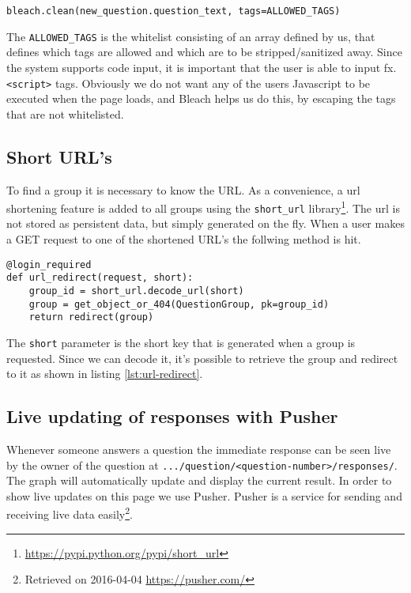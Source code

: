 \begin{lstlisting}[caption=Using Bleach to sanitize input, label=lst:bleach]
bleach.clean(new_question.question_text, tags=ALLOWED_TAGS)
\end{lstlisting}

The \texttt{ALLOWED\_TAGS} is the whitelist consisting of an array defined by us, that defines which tags are allowed and which are to be stripped/sanitized away. Since the system supports code input, it is important that the user is able to input fx. \texttt{<script>} tags. Obviously we do not want any of the users Javascript to be executed when the page loads, and Bleach helps us do this, by escaping the tags that are not whitelisted. 


\subsection{Short URL's}
To find a group it is necessary to know the URL. As a convenience, a url shortening feature is added to all groups using the \texttt{short\_url} library\footnote{\url{https://pypi.python.org/pypi/short_url}}. The url is not stored as persistent data, but simply generated on the fly. When a user makes a GET request to one of the shortened URL's the follwing method is hit.

\begin{lstlisting}[caption=The URL redirect method, label=lst:url-redirect]
@login_required
def url_redirect(request, short):
    group_id = short_url.decode_url(short)
    group = get_object_or_404(QuestionGroup, pk=group_id)
    return redirect(group)
\end{lstlisting}

The \texttt{short} parameter is the short key that is generated when a group is requested. Since we can decode it, it's possible to retrieve the group and redirect to it as shown in listing \ref{lst:url-redirect}.








\subsection{Live updating of responses with Pusher}
Whenever someone answers a question the immediate response can be seen live by the owner of the question at \texttt{.../question/<question-number>/responses/}. The graph will automatically update and display the current result. In order to show live updates on this page we use Pusher. Pusher is a service for sending and receiving live data easily\footnote{Retrieved on 2016-04-04 \url{https://pusher.com/}}.


